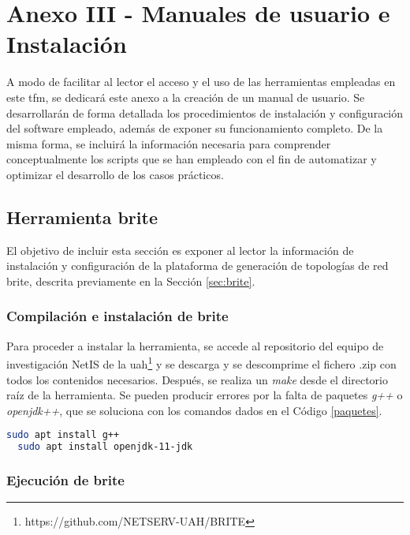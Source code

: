 \chapter{Anexo III - Manuales de usuario e Instalación}

A modo de facilitar al lector el acceso y el uso de las herramientas empleadas en este \gls{tfm}, se dedicará este anexo a la creación de un manual de usuario. Se desarrollarán de forma detallada los procedimientos de instalación y configuración del software empleado, además de exponer su funcionamiento completo. De la misma forma, se incluirá la información necesaria para comprender conceptualmente los scripts que se han empleado con el fin de automatizar y optimizar el desarrollo de los casos prácticos.

\section{Herramienta \acrshort{brite}}
\label{sec:manualbrite}

El objetivo de incluir esta sección es exponer al lector la información de instalación y configuración de la plataforma de generación de topologías de red \gls{brite}, descrita previamente en la Sección \ref{sec:brite}.

\subsection{Compilación e instalación de \acrshort{brite}}

Para proceder a instalar la herramienta, se accede al repositorio del equipo de investigación NetIS de la \gls{uah}\footnote{https://github.com/NETSERV-UAH/BRITE} y se descarga y se descomprime el fichero .zip con todos los contenidos necesarios. Después, se realiza un \textit{make} desde el directorio raíz de la herramienta. Se pueden producir errores por la falta de paquetes \textit{g++} o \textit{openjdk++}, que se soluciona con los comandos dados en el Código \ref{paquetes}.

\vspace{3mm}

\begin{lstlisting}[language=bash, style=Consola, caption={Instalación de paquetes}, label={paquetes}]
  sudo apt install g++
  sudo apt install openjdk-11-jdk
\end{lstlisting}

\newpage 

\subsection{Ejecución de \acrshort{brite}}


